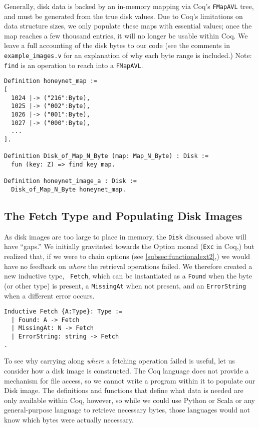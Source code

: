 \documentclass[nocopyrightspace,preprint]{sigplanconf}
\begin{document}
Generally, disk data is backed by an in-memory mapping via Coq's {\tt FMapAVL}
tree, and must be generated from the true disk values. Due to Coq's
limitations on data structure sizes, we only populate these maps with
essential values; once the map reaches a few thousand entries, it will no
longer be usable within Coq. We leave a full accounting of the disk bytes to
our code (see the comments in {\tt example\_images.v} for an explanation of
why each byte range is included.) Note: {\tt find} is an operation to reach
into a {\tt FMapAVL}.

\begin{lstlisting}
Definition honeynet_map := 
[ 
  1024 |-> ("216":Byte), 
  1025 |-> ("002":Byte),
  1026 |-> ("001":Byte), 
  1027 |-> ("000":Byte), 
  ...
].

Definition Disk_of_Map_N_Byte (map: Map_N_Byte) : Disk :=
  fun (key: Z) => find key map.

Definition honeynet_image_a : Disk := 
  Disk_of_Map_N_Byte honeynet_map.
\end{lstlisting}

\subsection{The Fetch Type and Populating Disk Images}
\label{subsec:fetch}

As disk images are too large to place in memory, the {\tt Disk} discussed
above will have ``gaps.'' We initially gravitated towards the Option monad
({\tt Exc} in Coq,) but realized that, if we were to chain options (see
\ref{subsec:functionalext2},) we would have no feedback on {\em where} the
retrieval operations failed. We therefore created a new inductive type, {\tt
Fetch}, which can be instantiated as a {\tt Found} when the byte (or other
type) is present, a {\tt MissingAt} when not present, and an {\tt ErrorString}
when a different error occurs.

\begin{lstlisting}
Inductive Fetch {A:Type}: Type :=
  | Found: A -> Fetch
  | MissingAt: N -> Fetch
  | ErrorString: string -> Fetch
.
\end{lstlisting}

To see why carrying along {\em where} a fetching operation failed is useful,
let us consider how a disk image is constructed. The Coq language does not
provide a mechanism for file access, so we cannot write a program within it to
populate our Disk image. The definitions and functions that define what data
is needed are only available within Coq, however, so while we could use Python
or Scala or any general-purpose language to retrieve necessary bytes, those
languages would not know which bytes were actually necessary.
\end{document}
